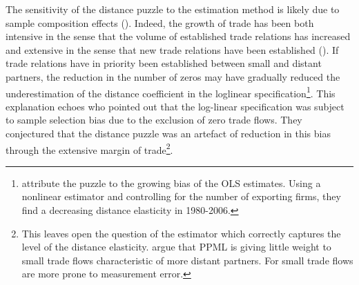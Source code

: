 \documentclass[12pt,twoside,a4paper,notitlepage]{article}
\begin{document}
The sensitivity of the distance puzzle to the estimation method is likely due to sample composition effects (\cite{Head2013,Larch2016}).
Indeed, the growth of trade has been both intensive in the sense that the volume of established trade relations has increased and extensive in the sense that new trade relations have been established (\cite{Helpman2008, Baldwin2011}). If trade relations have in priority been established between small and distant partners, the reduction in the number of zeros may have gradually reduced the underestimation of the distance coefficient in the loglinear specification\footnote{\cite{Larch2016} attribute the puzzle to the growing bias of the OLS estimates. Using a nonlinear estimator and controlling for the number of exporting firms, they find a decreasing distance elasticity in 1980-2006.}. This explanation echoes \cite{Felbermayr2006} who pointed out that the log-linear specification was subject to sample selection bias due to the exclusion of zero trade flows. They conjectured that the distance puzzle was an artefact of reduction in this bias through the extensive margin of trade\footnote{This leaves open the question of the estimator which correctly captures the level of the distance elasticity. \cite{Head2013} argue that PPML is giving little weight to small trade flows characteristic of more distant partners. For \cite{Silva2006} small trade flows are more prone to measurement error.}. 
\end{document}
